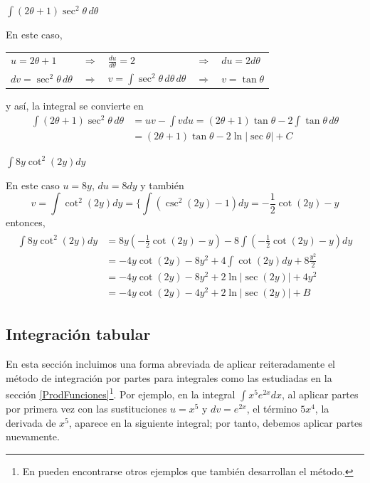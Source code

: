 \begin{parrafonumerado}
\clearpage

\item $\displaystyle{\int (2\theta +1)\sec^{2}\theta\,d\theta}$

En este caso,

\smallskip

\begin{center}
\begin{tabular}{lllll}
  $u=2\theta +1$ & $\Rightarrow$ & $\frac{du}{d\theta} =2$ & $\Rightarrow$ & $du=2d\theta$\\
  $dv=\sec ^{2}\theta\,d\theta$ & $\Rightarrow$ & $v =\int \sec ^{2}\theta\,d\theta\,d\theta$ & $\Rightarrow$ & $v=\tan \theta$
\end{tabular}
\end{center}

\medskip

y así, la integral se convierte en
\begin{align*}
\int (2\theta +1)\sec ^{2}\theta\,d\theta&=uv-\int vdu=(2\theta +1)\tan \theta -2\int \tan \theta\,d\theta\\
&=(2\theta +1)\tan \theta -2\ln |\sec \theta |+C
\end{align*}

\item $\int 8y\cot ^{2}(2y)dy$

En este caso $u=8y$, $du=8dy$ y también
\[v={\int\cot^{2}(2y)dy=\{\int\left(\csc^{2}(2y)-1\right) dy}=-\frac{1}{2}\cot (2y)-y\]
entonces,
\begin{gather*}
  \begin{aligned}
    \int 8y\cot ^{2}(2y)dy&=8y\left(-\frac{1}{2}\cot (2y)-y\right)-8\int\left( -\frac{1}{2}\cot (2y)-y\right)dy\\
    &=-4y\cot (2y)-8y^{2}+4\int \cot (2y)dy+8\frac{y^{2}}{2}\\
    &=-4y\cot (2y)-8y^{2}+2\ln |\sec (2y)|+4y^{2}\\
    &=-4y\cot (2y)-4y^{2}+2\ln |\sec (2y)|+B
  \end{aligned}
\end{gather*}

\end{parrafonumerado}

\subsection{Integración tabular}\label{tabular}

En esta sección incluimos una forma abreviada de aplicar reiteradamente el método de integración por partes para integrales como las estudiadas en la sección \ref{ProdFunciones}\footnote{En \textcite{thomas_calculo_2010} pueden encontrarse otros ejemplos que también desarrollan el método.}. Por ejemplo, en la integral ${\int x^{5}e^{2x}dx}$, al aplicar partes por primera vez con las sustituciones $u=x^5$ y $dv=e^{2x}$, el término $5x^4$, la derivada de $x^5$, aparece en la siguiente integral; por tanto, debemos aplicar partes nuevamente.

